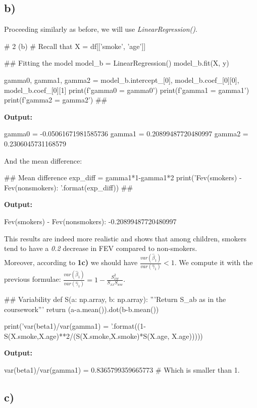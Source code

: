 \documentclass[a4paper]{article}
\begin{document}
\subsection*{b)}
Proceeding similarly as before, we will use \textit{LinearRegression()}.
\begin{python}
	# 2 (b)
	# Recall that X = df[['smoke', 'age']]
	
	## Fitting the model
	model_b = LinearRegression()
	model_b.fit(X, y)
	
	gamma0, gamma1, gamma2 = model_b.intercept_[0], model_b.coef_[0][0], model_b.coef_[0][1]
	print(f'gamma0 = {gamma0}')
	print(f'gamma1 = {gamma1}')
	print(f'gamma2 = {gamma2}')
	##
\end{python}
\textbf{Output:}
\begin{python}
	gamma0 = -0.05061671981585736
	gamma1 = 0.20899487720480997
	gamma2 = 0.2306045731168579
\end{python}
And the mean difference:
\begin{python}
	## Mean difference
	exp_diff = gamma1*1-gamma1*2
	print('Fev(smokers) - Fev(nonsmokers): {}'.format(exp_diff))
	##
\end{python}
\textbf{Output:}
\begin{python}
	Fev(smokers) - Fev(nonsmokers): -0.20899487720480997
\end{python}
This results are indeed more realistic and shows that among children, smokers tend to have a \textit{0.2} decrease in FEV compared to non-smokers.\\
Moreover, according to \textbf{1c)} we should have $\frac{var(\hat{\beta}_{1})}{var(\hat{\gamma}_{1})}<1$. We compute it with the previous formulae: $\frac{var(\hat{\beta}_{1})}{var(\hat{\gamma}_{1})} = 1-\frac{S_{xw}^2}{S_{xx}S_{ww}}$.
\begin{python}
	## Variability
	def S(a: np.array, b: np.array):
	    '''Return S_{ab} as in the coursework'''
	    return (a-a.mean()).dot(b-b.mean())
	
	print('var(beta1)/var(gamma1) = {}'.format((1-S(X.smoke,X.age)**2/(S(X.smoke,X.smoke)*S(X.age, X.age)))))
\end{python}
\textbf{Output:}
\begin{python}
	var(beta1)/var(gamma1) = 0.8365799359665773
	# Which is smaller than 1.
\end{python}

\subsection*{c)}
\end{document}
